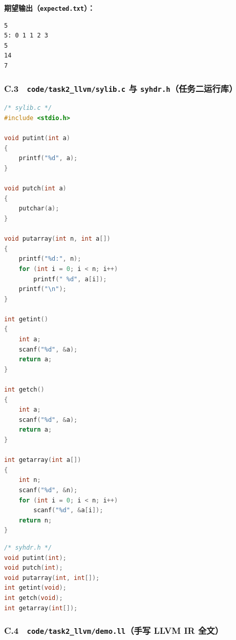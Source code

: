 \documentclass[UTF8,a4paper,10pt]{ctexart}
\begin{document}
\textbf{期望输出（\texttt{expected.txt}）：}

\begin{lstlisting}
5
5: 0 1 1 2 3
5
14
7\end{lstlisting}


\subsubsection{C.3　\texttt{code/task2\_llvm/sylib.c} 与 \texttt{syhdr.h}（任务二运行库）}


\begin{lstlisting}[language=C]
/* sylib.c */
#include <stdio.h>

void putint(int a)
{
    printf("%d", a);
}

void putch(int a)
{
    putchar(a);
}

void putarray(int n, int a[])
{
    printf("%d:", n);
    for (int i = 0; i < n; i++)
        printf(" %d", a[i]);
    printf("\n");
}

int getint()
{
    int a;
    scanf("%d", &a);
    return a;
}

int getch()
{
    int a;
    scanf("%d", &a);
    return a;
}

int getarray(int a[])
{
    int n;
    scanf("%d", &n);
    for (int i = 0; i < n; i++)
        scanf("%d", &a[i]);
    return n;
}\end{lstlisting}


\begin{lstlisting}[language=C]
/* syhdr.h */
void putint(int);
void putch(int);
void putarray(int, int[]);
int getint(void);
int getch(void);
int getarray(int[]);\end{lstlisting}


\subsubsection{C.4　\texttt{code/task2\_llvm/demo.ll}（手写 LLVM IR 全文）}
\end{document}
